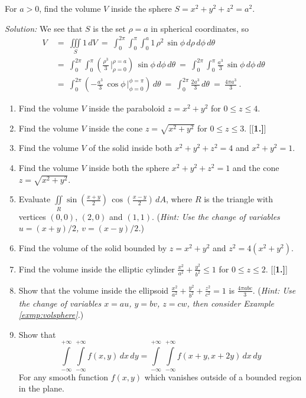 \begin{exmp}\label{exmp:volsphere}
 For $a > 0$, find the volume $V$ inside the sphere $S = x^2 + y^2 + z^2 = a^2$.\smallskip
 \par\noindent\emph{Solution:} We see that $S$ is the set $\rho = a$ in spherical coordinates, so
 \begin{align*}
  V ~&=~ \iiint\limits_{S} 1\,dV
   ~=~ \int_0^{2\pi} \int_0^{\pi} \int_0^a 1 \,\rho^2 \,\sin \phi \,d\rho\,d\phi\,d\theta\\
   &=~ \int_0^{2\pi} \int_0^{\pi} \left( \frac{\rho^3}{3}\,\Big|_{\rho=0}^{\rho=a}\right)\,\sin \phi \,d\phi\,d\theta
   ~=~ \int_0^{2\pi} \int_0^{\pi} \frac{a^3}{3}\,\sin \phi\,d\phi\,d\theta\\
   &=~ \int_0^{2\pi} \left(  -\frac{a^3}{3}\,\cos \phi\,\Big|_{\phi=0}^{\phi=\pi} \right) \,d\theta
   ~=~ \int_0^{2\pi} \frac{2a^3}{3}\,d\theta
   ~=~ \frac{4\pi a^3}{3} ~.
 \end{align*}
\end{exmp}
\startexercises\label{sec3dot5}
\begin{enumerate}[\bfseries 1.]
 \item Find the volume $V$ inside the paraboloid $z=x^2 + y^2$ for $0 \le z \le 4$.
 \item Find the volume $V$ inside the cone $z=\sqrt{x^2 + y^2}$ for $0 \le z \le 3$.
[{[\bfseries 1.]}]
 \item Find the volume $V$ of the solid inside both $x^2 + y^2 + z^2 = 4$ and $x^2 + y^2 = 1$.
 \item Find the volume $V$ inside both the sphere $x^2 + y^2 + z^2 = 1$ and the cone $z=\sqrt{x^2 + y^2}$.
 \item Evaluate $\iint\limits_{R} \sin \left( \frac{x+y}{2} \right)\,\cos \left( \frac{x-y}{2} \right)\,dA$, where $R$
  is the triangle with vertices $(0,0)$, $(2,0)$ and $(1,1)$. (\emph{Hint: Use the change of variables
  $u=(x+y)/2$, $v=(x-y)/2$.})
 \item Find the volume of the solid bounded by $z=x^2 + y^2$ and $z^2 = 4(x^2 + y^2)$.
 \item Find the volume inside the elliptic cylinder $\frac{x^2}{a^2} + \frac{y^2}{b^2} \le 1$ for $0\le z\le 2$.
[{[\bfseries 1.]}]
 \item Show that the volume inside the ellipsoid $\frac{x^2}{a^2} + \frac{y^2}{b^2} + \frac{z^2}{c^2} = 1$ is
  $\tfrac{4\pi abc}{3}$. (\emph{Hint: Use the change of variables $x=au$, $y=bv$, $z=cw$, then consider Example
  \ref{exmp:volsphere}.})
\item Show that 
\[\int\limits_{-\infty}^{+\infty}\,\int\limits_{-\infty}^{+\infty}f(x,y)\,dx\,dy
=
\int\limits_{-\infty}^{+\infty}\,\int\limits_{-\infty}^{+\infty}f(x+y,x+2y)\,dx\,dy\]
For any smooth function $f(x,y)$ which vanishes outside of a bounded region in the plane.
\end{enumerate}
\newpage

